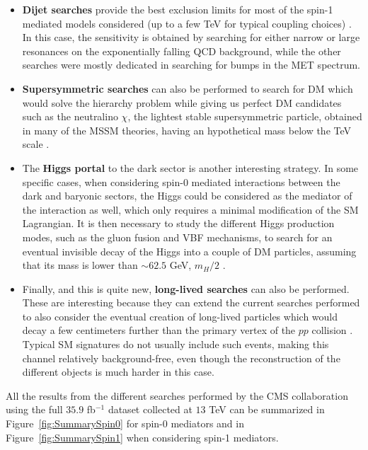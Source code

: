 \documentclass[a4paper, 10pt, openright]{report}
\begin{document}
\begin{itemize}
\item \textbf{Dijet searches} provide the best exclusion limits for most of the spin-1 mediated models considered (up to a few TeV for typical coupling choices) \cite{DijetAtlas, DijetCMS}. In this case, the sensitivity is obtained by searching for either narrow or large resonances on the exponentially falling QCD background, while the other searches were mostly dedicated in searching for bumps in the \ac{MET} spectrum.
\item \textbf{Supersymmetric searches} can also be performed to search for \ac{DM} which would solve the hierarchy problem while giving us perfect \ac{DM} candidates such as the neutralino $\chi$, the lightest stable supersymmetric particle, obtained in many of the \ac{MSSM} theories, having an hypothetical mass below the TeV scale \cite{SUSYDM}.
\item The \textbf{Higgs portal} to the dark sector is another interesting strategy. In some specific cases, when considering spin-0 mediated interactions between the dark and baryonic sectors, the Higgs could be considered as the mediator of the interaction as well, which only requires a minimal modification of the \ac{SM} Lagrangian. It is then necessary to study the different Higgs production modes, such as the gluon fusion and \ac{VBF} mechanisms, to search for an eventual invisible decay of the Higgs into a couple of \ac{DM} particles, assuming that its mass is lower than $\sim 62.5$ GeV, $m_H/2$ \cite{InvisibleHiggs}.
\item Finally, and this is quite new, \textbf{long-lived searches} can also be performed. These are interesting because they can extend the current searches performed to also consider the eventual creation of long-lived particles which would decay a few centimeters further than the primary vertex of the $pp$ collision \cite{LLSearches}. Typical \ac{SM} signatures do not usually include such events, making this channel relatively background-free, even though the reconstruction of the different objects is much harder in this case.
\end{itemize}

All the results from the different searches performed by the \ac{CMS} collaboration using the full $35.9$ fb$^{-1}$ dataset collected at $13$ TeV can be summarized in Figure~\ref{fig:SummarySpin0} for spin-0 mediators and in Figure~\ref{fig:SummarySpin1} when considering spin-1 mediators.
\end{document}
